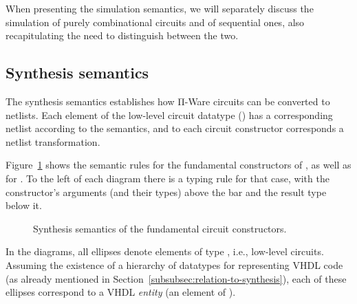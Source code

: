         When presenting the simulation semantics, we will separately discuss the simulation of
        purely combinational circuits and of sequential ones,
        also recapitulating the need to distinguish between the two.

        \subsection{Synthesis semantics}
        \label{subsec:synthesis-semantics}
            The synthesis semantics establishes how Π-Ware circuits can be converted to netlists.
            Each element of the low-level circuit datatype () has a corresponding netlist
            according to the semantics,
            and to each circuit constructor corresponds a netlist transformation.

            Figure~\ref{fig:semantics-syn-fundamental} shows the semantic rules for the
            fundamental constructors of , as well as for .
            To the left of each diagram there is a typing rule for that case,
            with the constructor's arguments (and their types) above the bar and the result type below it.

            \begin{figure}[h]
                \caption{Synthesis semantics of the fundamental circuit constructors.\label{fig:semantics-syn-fundamental}}
            \end{figure}

            In the diagrams, all ellipses denote elements of type , i.e., low-level circuits.
            Assuming the existence of a hierarchy of datatypes for representing \ac{VHDL} code
            (as already mentioned in Section~\ref{subsubsec:relation-to-synthesis}),
            each of these ellipses correspond to a \ac{VHDL} \emph{entity} (an element of ).

